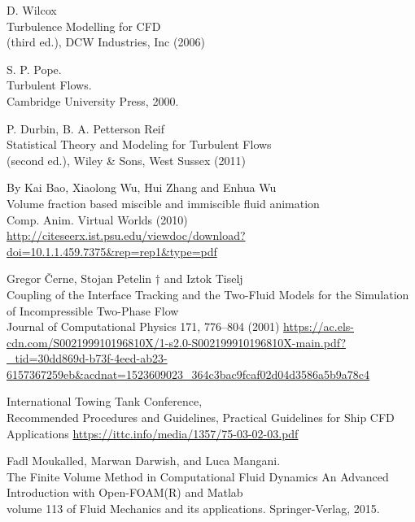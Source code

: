 \documentclass[a4paper, 12pt]{report}
\begin{document}
\begin{thebibliography}{9}
	 D. Wilcox\\
	 Turbulence Modelling for CFD\\
	(third ed.), DCW Industries, Inc (2006)
	
	S. P. Pope.\\
	Turbulent Flows.\\
	Cambridge University Press, 2000.

	 P. Durbin, B. A. Petterson Reif\\
	 Statistical Theory and Modeling for Turbulent Flows\\
	(second ed.), Wiley \& Sons, West Sussex (2011)
	
	By Kai Bao, Xiaolong Wu, Hui Zhang and Enhua Wu\\
	Volume fraction based miscible and immiscible fluid animation\\
	Comp. Anim. Virtual Worlds (2010)
	\url{http://citeseerx.ist.psu.edu/viewdoc/download?doi=10.1.1.459.7375&rep=rep1&type=pdf}
	
	Gregor Černe, Stojan Petelin † and Iztok Tiselj\\
	Coupling of the Interface Tracking and the Two-Fluid Models 		for the Simulation of Incompressible Two-Phase Flow\\
	Journal of Computational Physics 171, 776–804 (2001)
	\url{https://ac.els-cdn.com/S002199910196810X/1-s2.0-S002199910196810X-main.pdf?_tid=30dd869d-b73f-4eed-ab23-6157367259eb&acdnat=1523609023_364c3bac9fcaf02d04d3586a5b9a78c4}
	
	International Towing Tank Conference,\\
	Recommended Procedures and Guidelines, Practical Guidelines for Ship CFD Applications
	\url{https://ittc.info/media/1357/75-03-02-03.pdf}
	
	Fadl Moukalled, Marwan Darwish, and Luca Mangani.\\
	The Finite Volume Method in Computational Fluid Dynamics An Advanced Introduction with 	Open-FOAM(R) and Matlab\\
	volume 113 of Fluid Mechanics and its applications. Springer-Verlag, 2015.
	
\end{thebibliography}
\end{document}
